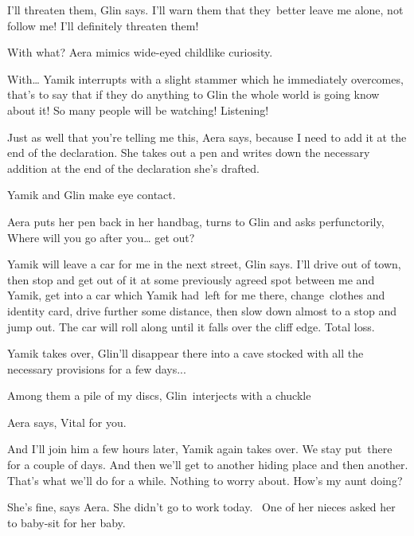 \documentclass[letterpaper]{article}
\begin{document}
{\textquotedbl}I'll threaten them,{\textquotedbl} Glin says. {\textquotedbl}I'll warn them that they\ better leave me
alone, not follow me! I'll definitely threaten them!{\textquotedbl}

{\textquotedbl}With what?{\textquotedbl} Aera mimics wide-eyed childlike curiosity.

{\textquotedbl}With{\dots}{\textquotedbl} Yamik interrupts with a slight stammer which he immediately overcomes,
{\textquotedbl}that's to say that if they do anything to Glin the whole world is going know about it! So many people
will be watching! Listening!{\textquotedbl}

{\textquotedbl}Just as well that you're telling me this,{\textquotedbl} Aera says, {\textquotedbl}because I need to add
it at the end of the declaration.{\textquotedbl} She takes out a pen and writes down the necessary addition at the end
of the declaration she's drafted. 

Yamik and Glin make eye contact. 

Aera puts her pen back in her handbag, turns to Glin and asks perfunctorily, {\textquotedbl}Where will you go after
you{\dots} get out?{\textquotedbl} 

{\textquotedbl}Yamik will leave a car for me in the next street,{\textquotedbl} Glin says. {\textquotedbl}I'll drive out
of town, then stop and get out of it at some previously agreed spot between me and Yamik, get into a car which Yamik
had\ left for me there, change\ clothes and identity card, drive further some distance, then slow down almost to a stop
and jump out. The car will roll along until it falls over the cliff edge. Total loss.{\textquotedbl} 

Yamik takes over, {\textquotedbl}Glin'll disappear there into a cave stocked with all the necessary provisions for a few
days...{\textquotedbl} 

{\textquotedbl}Among them a pile of my discs,{\textquotedbl} Glin\ interjects with a chuckle\ 

Aera says, {\textquotedbl}Vital for you.{\textquotedbl} 

{\textquotedbl}And I{}'ll join him a few hours later,{\textquotedbl} Yamik again takes over. {\textquotedbl}We stay
put~there for a couple of days. And then we'll get to another hiding place and then another. That's what we'll do for a
while. Nothing to worry about. How's my aunt doing?{\textquotedbl} 

{\textquotedbl}She's fine,{\textquotedbl} says Aera. {\textquotedbl}She didn't go to work today.~ One of her nieces
asked her to baby-sit for her baby.{\textquotedbl} 
\end{document}
